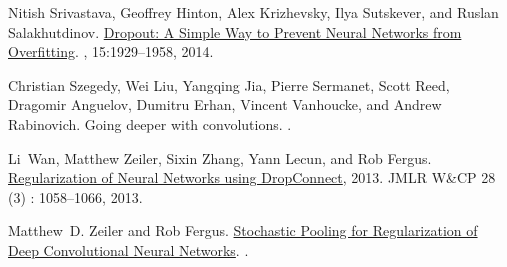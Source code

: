 \documentclass[english]{article}
\begin{document}
\begin{thebibliography}{10}
Nitish Srivastava, Geoffrey Hinton, Alex Krizhevsky, Ilya Sutskever, and Ruslan
  Salakhutdinov.
\newblock \href{http://jmlr.org/papers/v15/srivastava14a.html}{Dropout: A
  Simple Way to Prevent Neural Networks from Overfitting}.
, 15:1929--1958, 2014.

Christian Szegedy, Wei Liu, Yangqing Jia, Pierre Sermanet, Scott Reed, Dragomir
  Anguelov, Dumitru Erhan, Vincent Vanhoucke, and Andrew Rabinovich.
\newblock Going deeper with convolutions.
.

Li~Wan, Matthew Zeiler, Sixin Zhang, Yann Lecun, and Rob Fergus.
\newblock
  \href{http://jmlr.org/proceedings/papers/v28/wan13.html}{Regularization of
  Neural Networks using DropConnect}, 2013.
\newblock JMLR W\&CP 28 (3) : 1058--1066, 2013.

Matthew~D. Zeiler and Rob Fergus.
\newblock \href{http://arxiv.org/abs/1301.3557}{Stochastic Pooling for
  Regularization of Deep Convolutional Neural Networks}.
.

\end{thebibliography}
\end{document}

